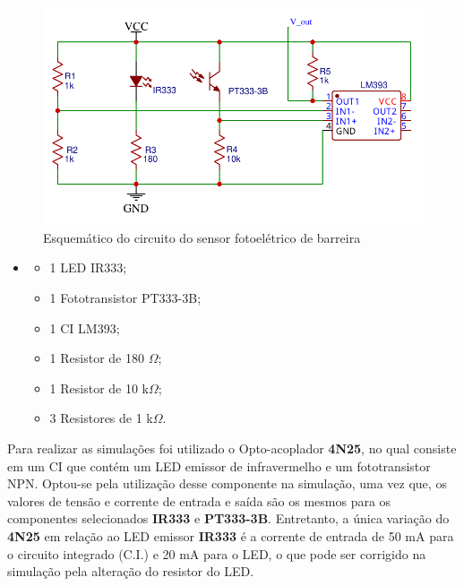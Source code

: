     \begin{figure}[H]
    \centering
    \includegraphics[scale=0.7]{figuras/eletronica/esquematicos/sensor_barreira/Schematic_Sensor_barreira.pdf}
    \caption{Esquemático do circuito do sensor fotoelétrico de barreira}
    \label{fig:esq_sensor_barreira}
    \end{figure}
    
    \begin{itemize}
    \item[ ]
        \begin{itemize}
            \item 1 LED IR333;
            \item 1 Fototransistor PT333-3B;
            \item 1 CI LM393;
            \item 1 Resistor de 180 $\Omega$;
            \item 1 Resistor de 10 k$\Omega$;
            \item 3 Resistores de 1 k$\Omega$.
        \end{itemize}
    \end{itemize}
    
    Para realizar as simulações foi utilizado o Opto-acoplador \textbf{4N25}, no qual consiste em um CI que contém um LED emissor de infravermelho e um fototransistor NPN. Optou-se pela utilização desse componente na simulação, uma vez que, os valores de tensão e corrente de entrada e saída são os mesmos para os componentes selecionados \textbf{IR333} e \textbf{PT333-3B}. Entretanto, a única variação do \textbf{4N25} em relação ao LED emissor \textbf{IR333} é a corrente de entrada de 50 mA para o circuito integrado (C.I.) e 20 mA para o LED, o que pode ser corrigido na simulação pela alteração do resistor do LED.
    
